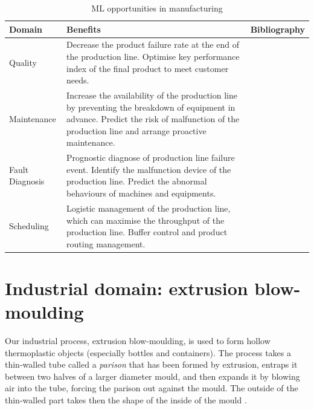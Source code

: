 \begin{table}
\label{tab:ai_benefits}
\caption{ML opportunities in manufacturing}
\begin{tabular}{|l|p{6cm}|p{4cm}|}
\hline
%
Domain &
  Benefits &
    Bibliography \\ \hline
Quality  &
  Decrease the product failure rate at the end of the production line. Optimise key performance index of the final product to meet customer needs. &
    \citep{lieber2013quality, li2018ensemble, chen2008neural, nagorny2017quality, haeussler1996quality} \\ \hline

Maintenance &
  Increase the availability of the production line by preventing the breakdown of equipment in advance. Predict the risk of malfunction of the production line and arrange proactive maintenance. &
    \citep{nguyen2019new, lee2017application, einabadi2019dynamic, li2017intelligent, liu2016prediction}\\ \hline
Fault Diagnosis &
  Prognostic diagnose of production line failure event. Identify the malfunction device of the production line. Predict the abnormal behaviours of machines and equipments. & \citep{toma2020bearing, wong2006modified, chen2014fault, malik2017artificial, arabaci2010automatic} \\ \hline
Scheduling  &
  Logistic management of the production line, which can maximise the throughput of the production line. Buffer control and product routing management. & \citep{morariu2020machine, woschank2020review, lolli2019machine, zhang2019review, gomes2016developing} \\ \hline
\end{tabular}
\end{table}


\section{Industrial domain: extrusion blow-moulding} \label{Industrial domain: extrusion blow-moulding}

Our industrial process, extrusion blow-moulding, is used to form hollow thermoplastic objects (especially bottles and containers). The process takes a thin-walled tube called a \textit{parison} that has been formed by extrusion, entraps it between two halves of a larger diameter mould, and then expands it by blowing air into the tube, forcing the parison out against the mould. The outside of the thin-walled part takes then the shape of the inside of the mould \citep{poli2001design}.

